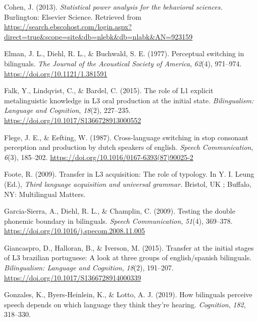 \documentclass[
  man]{apa6}
\newlength{\cslhangindent}
\newlength{\cslentryspacingunit} %
\newenvironment{CSLReferences}[2] %
 {%
  \setlength{\parindent}{0pt}
  \ifodd #1
  \let\oldpar\par
  \def\par{\hangindent=\cslhangindent\oldpar}
  \fi
  \setlength{\parskip}{#2\cslentryspacingunit}
 }%
 {}
\begin{document}
\begin{CSLReferences}{1}{0}
\leavevmode{}%
Cohen, J. (2013). \emph{Statistical power analysis for the behavioral sciences.} Burlington: Elsevier Science. Retrieved from \url{https://search.ebscohost.com/login.aspx?direct=true\&scope=site\&db=nlebk\&db=nlabk\&AN=923159}

\leavevmode{}%
Elman, J. L., Diehl, R. L., \& Buchwald, S. E. (1977). Perceptual switching in bilinguals. \emph{The Journal of the Acoustical Society of America}, \emph{62}(4), 971--974. \url{https://doi.org/10.1121/1.381591}

\leavevmode{}%
Falk, Y., Lindqvist, C., \& Bardel, C. (2015). The role of L1 explicit metalinguistic knowledge in L3 oral production at the initial state. \emph{Bilingualism: Language and Cognition}, \emph{18}(2), 227--235. \url{https://doi.org/10.1017/S1366728913000552}

\leavevmode{}%
Flege, J. E., \& Eefting, W. (1987). Cross-language switching in stop consonant perception and production by dutch speakers of english. \emph{Speech Communication}, \emph{6}(3), 185--202. \url{https://doi.org/10.1016/0167-6393(87)90025-2}

\leavevmode{}%
Foote, R. (2009). Transfer in L3 acquisition: The role of typology. In Y. I. Leung (Ed.), \emph{Third language acquisition and universal grammar}. Bristol, {UK} ; Buffalo, {NY}: Multilingual Matters.

\leavevmode{}%
Garcia-Sierra, A., Diehl, R. L., \& Champlin, C. (2009). Testing the double phonemic boundary in bilinguals. \emph{Speech Communication}, \emph{51}(4), 369--378. \url{https://doi.org/10.1016/j.specom.2008.11.005}

\leavevmode{}%
Giancaspro, D., Halloran, B., \& Iverson, M. (2015). Transfer at the initial stages of L3 brazilian portuguese: A look at three groups of english/spanish bilinguals. \emph{Bilingualism: Language and Cognition}, \emph{18}(2), 191--207. \url{https://doi.org/10.1017/S1366728914000339}

\leavevmode{}%
Gonzales, K., Byers-Heinlein, K., \& Lotto, A. J. (2019). How bilinguals perceive speech depends on which language they think they're hearing. \emph{Cognition}, \emph{182}, 318--330.


\end{CSLReferences}
\end{document}
